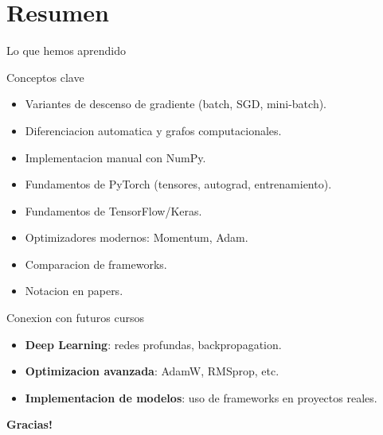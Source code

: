 \documentclass[aspectratio=169, 10pt, xcolor=table]{beamer}
\begin{document}
\section{Resumen}

\begin{frame}{Lo que hemos aprendido}
    \begin{exampleblock}{Conceptos clave}
        \begin{itemize}
            \item Variantes de descenso de gradiente (batch, SGD, mini-batch).
            \item Diferenciacion automatica y grafos computacionales.
            \item Implementacion manual con NumPy.
            \item Fundamentos de PyTorch (tensores, autograd, entrenamiento).
            \item Fundamentos de TensorFlow/Keras.
            \item Optimizadores modernos: Momentum, Adam.
            \item Comparacion de frameworks.
            \item Notacion en papers.
        \end{itemize}
    \end{exampleblock}
\end{frame}

\begin{frame}{Conexion con futuros cursos}
    \begin{itemize}
        \item \textbf{Deep Learning}: redes profundas, backpropagation.
        \item \textbf{Optimizacion avanzada}: AdamW, RMSprop, etc.
        \item \textbf{Implementacion de modelos}: uso de frameworks en proyectos reales.
    \end{itemize}
\end{frame}

\begin{frame}
    \centering
    \Huge \textbf{Gracias!}

\end{frame}
\end{document}
